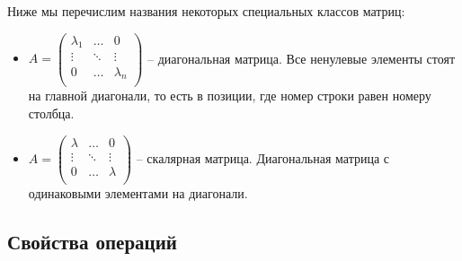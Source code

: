 Ниже мы перечислим названия некоторых специальных классов матриц:
\begin{itemize}
\item 
$A = 
\begin{pmatrix}
{\lambda_1}&{\ldots}&{0}\\
{\vdots}&{\ddots}&{\vdots}\\
{0}&{\ldots}&{\lambda_n}\\
\end{pmatrix}$ -- диагональная матрица.
Все ненулевые элементы стоят на главной диагонали, то есть в позиции, где номер строки равен номеру столбца.

\item
$A = 
\begin{pmatrix}
{\lambda}&{\ldots}&{0}\\
{\vdots}&{\ddots}&{\vdots}\\
{0}&{\ldots}&{\lambda}\\
\end{pmatrix}$ -- скалярная матрица.
Диагональная матрица с одинаковыми элементами на диагонали.
\end{itemize}

\subsection{Свойства операций}

